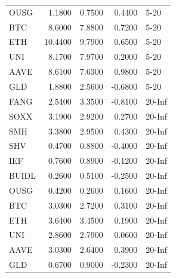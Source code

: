\begin{tabular}{lrrrl}
OUSG & 1.1800 & 0.7500 & 0.4400 & 5-20 \\
BTC & 8.6000 & 7.8800 & 0.7200 & 5-20 \\
ETH & 10.4400 & 9.7900 & 0.6500 & 5-20 \\
UNI & 8.1700 & 7.9700 & 0.2000 & 5-20 \\
AAVE & 8.6100 & 7.6300 & 0.9800 & 5-20 \\
GLD & 1.8800 & 2.5600 & -0.6800 & 5-20 \\
FANG & 2.5400 & 3.3500 & -0.8100 & 20-Inf \\
SOXX & 3.1900 & 2.9200 & 0.2700 & 20-Inf \\
SMH & 3.3800 & 2.9500 & 0.4300 & 20-Inf \\
SHV & 0.4700 & 0.8800 & -0.4000 & 20-Inf \\
IEF & 0.7600 & 0.8900 & -0.1200 & 20-Inf \\
BUIDL & 0.2600 & 0.5100 & -0.2500 & 20-Inf \\
OUSG & 0.4200 & 0.2600 & 0.1600 & 20-Inf \\
BTC & 3.0300 & 2.7200 & 0.3100 & 20-Inf \\
ETH & 3.6400 & 3.4500 & 0.1900 & 20-Inf \\
UNI & 2.8600 & 2.7900 & 0.0600 & 20-Inf \\
AAVE & 3.0300 & 2.6400 & 0.3900 & 20-Inf \\
GLD & 0.6700 & 0.9000 & -0.2300 & 20-Inf \\
\bottomrule
\end{tabular}
